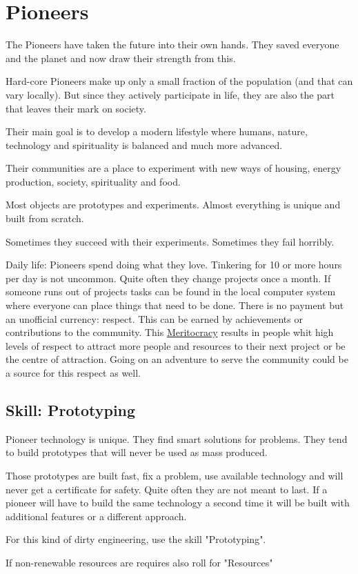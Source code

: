 \section{Pioneers}

The Pioneers have taken the future into their own hands. They saved everyone and the planet and now draw their strength from this.

Hard-core Pioneers make up only a small fraction of the population (and that can vary locally). But since they actively participate in life, they are also the part that leaves their mark on society.

Their main goal is to develop a modern lifestyle where humans, nature, technology and spirituality is balanced and much more advanced.

Their communities are a place to experiment with new ways of housing, energy production, society, spirituality and food.

Most objects are prototypes and experiments. Almost everything is unique and built from scratch.

Sometimes they succeed with their experiments. Sometimes they fail horribly.


Daily life: Pioneers spend doing what they love. Tinkering for 10 or more hours per day is not uncommon. Quite often they change projects once a month. If someone runs out of projects tasks can be found in the local computer system where everyone can place things that need to be done. There is no payment but an unofficial currency: respect. This can be earned by achievements or contributions to the community. This \hyperref[sec:meritocracy]{Meritocracy} results in people whit high levels of respect to attract more people and resources to their next project or be the centre of attraction.
Going on an adventure to serve the community could be a source for this respect as well.

\subsection{Skill: Prototyping}

Pioneer technology is unique. They find smart solutions for problems. They tend to build prototypes that will never be used as mass produced.

Those prototypes are built fast, fix a problem, use available technology and will never get a certificate for safety.
Quite often they are not meant to last.
If a pioneer will have to build the same technology a second time it will be built with additional features or a different approach.

For this kind of dirty engineering, use the skill "Prototyping".

If non-renewable resources are requires also roll for "Resources"